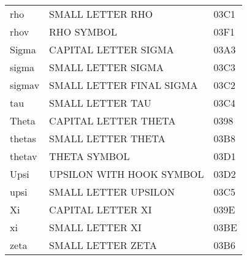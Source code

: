 \begin{latin}
\begin{longtable}{@{}lll}
rho                &  SMALL LETTER RHO              & 03C1\\
rhov               &  RHO SYMBOL                    & 03F1\\
Sigma              &  CAPITAL LETTER SIGMA          & 03A3\\
sigma              &  SMALL LETTER SIGMA            & 03C3\\
sigmav             &  SMALL LETTER FINAL SIGMA      & 03C2\\
tau                &  SMALL LETTER TAU              & 03C4\\
Theta              &  CAPITAL LETTER THETA          & 0398\\
thetas             &  SMALL LETTER THETA            & 03B8\\
thetav             &  THETA SYMBOL                  & 03D1\\
Upsi               &  UPSILON WITH HOOK SYMBOL      & 03D2\\
upsi               &  SMALL LETTER UPSILON          & 03C5\\
Xi                 &  CAPITAL LETTER XI             & 039E\\
xi                 &  SMALL LETTER XI               & 03BE\\
zeta               &  SMALL LETTER ZETA             & 03B6\\
\end{longtable}
\end{latin}


